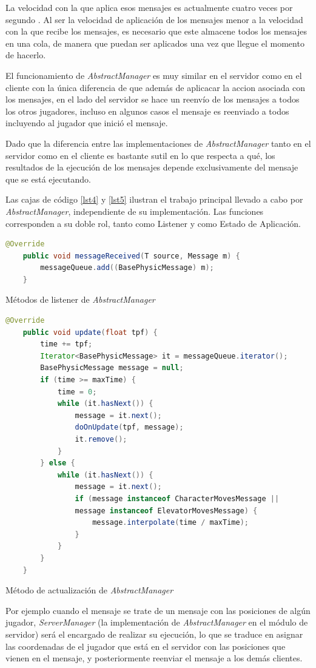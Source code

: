 \documentclass[a4paper,12pt,openany,oneside]{book}
\begin{document}
La velocidad con la que aplica esos mensajes es actualmente cuatro veces por segundo \cite{VALVE1}. Al ser la velocidad de aplicación de los mensajes menor a la velocidad con la que recibe los mensajes, es necesario que este almacene todos los mensajes en una cola, de manera que puedan ser aplicados una vez que llegue el momento de hacerlo.

El funcionamiento de \textit{AbstractManager} es muy similar en el servidor como en el cliente con la única diferencia de que además de aplicacar la accion asociada con los mensajes, en el lado del servidor se hace un reenvío de los mensajes a todos los otros jugadores, incluso en algunos casos el mensaje es reenviado a todos incluyendo al jugador que inició el mensaje.

Dado que la diferencia entre las implementaciones de \textit{AbstractManager} tanto en el servidor como en el cliente es bastante sutil en lo que respecta a qué, los resultados de la ejecución de los mensajes depende exclusivamente del mensaje que se está ejecutando.

Las cajas de código \ref{lst4} y \ref{lst5} ilustran el trabajo principal llevado a cabo por \textit{AbstractManager}, independiente de su implementación. Las funciones corresponden a su doble rol, tanto como Listener y como Estado de Aplicación.
\newpage
\begin{codigo}
\begin{lstlisting}[language=Java,frame=single,basicstyle=\scriptsize]
    @Override
    public void messageReceived(T source, Message m) {
        messageQueue.add((BasePhysicMessage) m);
    }
\end{lstlisting}
\caption{Métodos de listener de \textit{AbstractManager}}
\label{lst4}
\end{codigo}
\begin{codigo}
\begin{lstlisting}[language=Java,frame=single,basicstyle=\scriptsize]
    @Override
    public void update(float tpf) {
        time += tpf;
        Iterator<BasePhysicMessage> it = messageQueue.iterator();
        BasePhysicMessage message = null;
        if (time >= maxTime) {
            time = 0;
            while (it.hasNext()) {
                message = it.next();
                doOnUpdate(tpf, message);
                it.remove();
            }
        } else {
            while (it.hasNext()) {
                message = it.next();
                if (message instanceof CharacterMovesMessage || 
                message instanceof ElevatorMovesMessage) {
                    message.interpolate(time / maxTime);
                }
            }
        }
    }
\end{lstlisting}
\caption{Método de actualización de \textit{AbstractManager}}
\label{lst5}
\end{codigo}
Por ejemplo cuando el mensaje se trate de un mensaje con las posiciones de algún jugador, \textit{ServerManager} (la implementación de \textit{AbstractManager} en el módulo de servidor) será el encargado de realizar su ejecución, lo que se traduce en asignar las coordenadas de el jugador que está en el servidor con las posiciones que vienen en el mensaje, y posteriormente reenviar el mensaje a los demás clientes.
\end{document}
